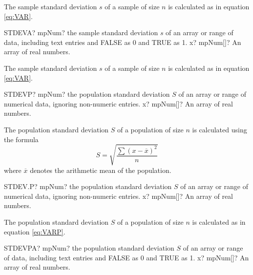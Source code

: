 The sample standard deviation $s$ of a sample of size $n$ is calculated as in equation \ref{eq:VAR}.



\vspace{0.6cm}
\begin{mpFunctionsExtract}
	\mpWorksheetFunctionOneNotImplemented
	{STDEVA? mpNum? the sample standard deviation $s$ of an array or range of data, including text entries and FALSE as 0 and TRUE as 1.}
	{x? mpNum[]? An array of real numbers.}
\end{mpFunctionsExtract}

The sample standard deviation $s$ of a sample of size $n$ is calculated as in equation \ref{eq:VAR}.


\vspace{0.6cm}
\begin{mpFunctionsExtract}
	\mpWorksheetFunctionOneNotImplemented
	{STDEVP? mpNum? the population standard deviation $S$ of an array or range of numerical data, ignoring non-numeric entries.}
	{x? mpNum[]? An array of real numbers.}
\end{mpFunctionsExtract}

The population standard deviation $S$ of a population of size $n$ is calculated using the formula
\begin{equation}  \label{eq:STDEVP}
	S = \sqrt{\frac{\sum (x-\overline{x})^2}{n}} 
\end{equation}
where $\overline{x}$ denotes the arithmetic mean of the population.



\vspace{0.6cm}
\begin{mpFunctionsExtract}
	\mpWorksheetFunctionOneNotImplemented
	{STDEV.P? mpNum? the population standard deviation $S$ of an array or range of numerical data, ignoring non-numeric entries.}
	{x? mpNum[]? An array of real numbers.}
\end{mpFunctionsExtract}

The population standard deviation $S$ of a population of size $n$ is calculated as in equation \ref{eq:VARP}.



\vspace{0.6cm}
\begin{mpFunctionsExtract}
	\mpWorksheetFunctionOneNotImplemented
	{STDEVPA? mpNum? the population standard deviation $S$ of an array or range of data, including text entries and FALSE as 0 and TRUE as 1.}
	{x? mpNum[]? An array of real numbers.}
\end{mpFunctionsExtract}

